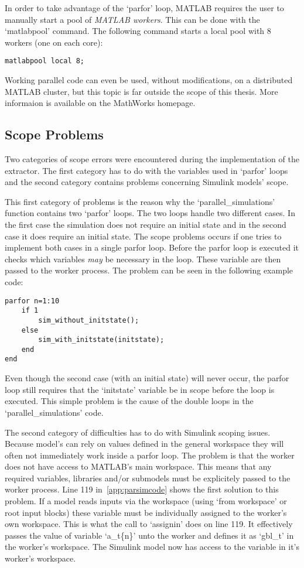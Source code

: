 In order to take advantage of the `parfor' loop, MATLAB requires the user to manually start a pool of \textit{MATLAB workers}. This can be done with the `matlabpool' command. The following command starts a local pool with 8 workers (one on each core):

\begin{lstlisting}
matlabpool local 8;
\end{lstlisting}

Working parallel code can even be used, without modifications, on a distributed MATLAB cluster, but this topic is far outside the scope of this thesis. More informaion is available on the MathWorks homepage.


\subsection{Scope Problems}

Two categories of scope errors were encountered during the implementation of the extractor. The first category has to do with the variables used in `parfor' loops and the second category contains problems concerning Simulink models' scope.

This first category of problems is the reason why the `parallel\_simulations' function contains two `parfor' loops. The two loops handle two different cases. In the first case the simulation does not require an initial state and in the second case it does require an initial state. The scope problems occurs if one tries to implement both cases in a single parfor loop. Before the parfor loop is executed it checks which variables \textit{may} be necessary in the loop. These variable are then passed to the worker process. The problem can be seen in the following example code:

\begin{lstlisting}
parfor n=1:10
    if 1
        sim_without_initstate();
    else
        sim_with_initstate(initstate);
    end
end
\end{lstlisting}

Even though the second case (with an initial state) will never occur, the parfor loop still requires that the `initstate' variable be in scope before the loop is executed. This simple problem is the cause of the double loops in the `parallel\_simulations' code.

The second category of difficulties has to do with Simulink scoping issues. Because model's can rely on values defined in the general workspace they will often not immediately work inside a parfor loop. The problem is that the worker does not have access to MATLAB's main workspace. This means that any required variables, libraries and/or submodels must be explicitely passed to the worker process. Line 119 in~\ref{app:parsimcode} shows the first solution to this problem. If a model reads inputs via the workspace (using `from workspace' or root input blocks) these variable must be individually assigned to the worker's own workspace. This is what the call to `assignin' does on line 119. It effectively passes the value of variable `a\_t\{n\}' unto the worker and defines it as `gbl\_t' in the worker's workspace. The Simulink model now has access to the variable in it's worker's workspace.

